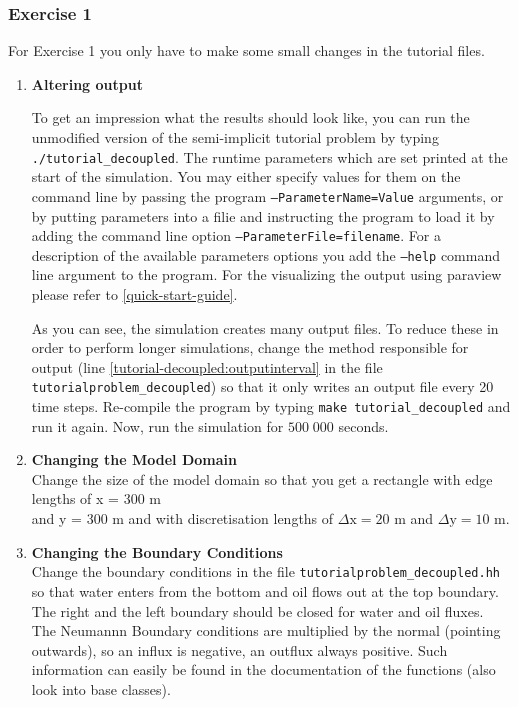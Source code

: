 \subsubsection{Exercise 1}
\renewcommand{\labelenumi}{\alph{enumi})}
For Exercise 1 you only have to make some small changes in the tutorial files.
\begin{enumerate}
\item \textbf{Altering output}

  To get an impression what the results should look like, you can run
  the unmodified version of the semi-implicit tutorial problem by
  typing \texttt{./tutorial\_decoupled}. The runtime parameters which
  are set printed at the start of the simulation. You may either
  specify values for them on the command line by passing the program
  \texttt{--ParameterName=Value} arguments, or by putting parameters
  into a filie and instructing the program to load it by adding the
  command line option \texttt{--ParameterFile=filename}. For a
  description of the available parameters options you add the
  \texttt{--help} command line argument to the program. For the
  visualizing the output using paraview please refer to
  \ref{quick-start-guide}.

  As you can see, the simulation creates many output files. To reduce
  these in order to perform longer simulations, change the method
  responsible for output (line \ref{tutorial-decoupled:outputinterval}
  in the file \texttt{tutorialproblem\_decoupled}) so that it only
  writes an output file every 20 time steps. Re-compile the program by
  typing \texttt{make tutorial\_decoupled} and run it again. Now, run
  the simulation for $500\;000$ seconds.

\item \textbf{Changing the Model Domain} \\
Change the size of the model domain so that you get a rectangle
with edge lengths of x = 300 m \\  and y = 300 m and with discretisation lengths of  $\Delta \text{x} = 20$ m and $\Delta \text{y} = 10$ m. \\


\item \textbf{Changing the Boundary Conditions} \\
Change the boundary conditions in the file \texttt{tutorialproblem\_decoupled.hh} so that water enters from the bottom and oil flows out at the top boundary. The right and the left boundary should be closed for water and oil fluxes. The Neumannn Boundary conditions are multiplied by the normal (pointing outwards), so an influx is negative, an outflux always positive. Such information can easily be found in the documentation of the functions (also look into base classes).


\end{enumerate}
